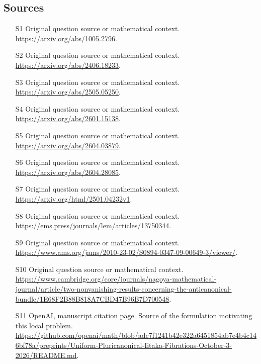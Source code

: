 \documentclass[11pt]{article}
\begin{document}
\subsection{Sources}
\begin{itemize}
\item[S1] Original question source or mathematical context.
\url{https://arxiv.org/abs/1005.2796}.
\item[S2] Original question source or mathematical context.
\url{https://arxiv.org/abs/2406.18233}.
\item[S3] Original question source or mathematical context.
\url{https://arxiv.org/abs/2505.05250}.
\item[S4] Original question source or mathematical context.
\url{https://arxiv.org/abs/2601.15138}.
\item[S5] Original question source or mathematical context.
\url{https://arxiv.org/abs/2604.03879}.
\item[S6] Original question source or mathematical context.
\url{https://arxiv.org/abs/2604.28085}.
\item[S7] Original question source or mathematical context.
\url{https://arxiv.org/html/2501.04232v1}.
\item[S8] Original question source or mathematical context.
\url{https://ems.press/journals/lem/articles/13750344}.
\item[S9] Original question source or mathematical context.
\url{https://www.ams.org/jams/2010-23-02/S0894-0347-09-00649-3/viewer/}.
\item[S10] Original question source or mathematical context.
\url{https://www.cambridge.org/core/journals/nagoya-mathematical-journal/article/two-nonvanishing-results-concerning-the-anticanonical-bundle/1E68F2B88B818A7CBD47B96B7D700548}.
\item[S11] OpenAI, manuscript citation page. Source of the formulation motivating this local problem.
\url{https://github.com/openai/math/blob/adc7f1241b42e322a6451854ab7e4b4c146bf78a/preprints/Uniform-Pluricanonical-Iitaka-Fibrations-October-3-2026/README.md}.
\end{itemize}
\end{document}
